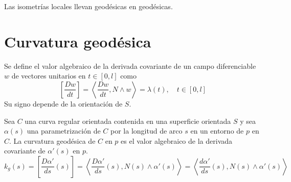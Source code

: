 \begin{corollary}
    Las isometrías locales llevan geodésicas en geodésicas.
\end{corollary}

\section{Curvatura geodésica}

\begin{definition}
    Se define el valor algebraico de la derivada covariante de un campo diferenciable $w$ de vectores unitarios en $t \in [0, l]$ como
    $$\left[ \frac{Dw}{dt} \right] = \left\langle \frac{Dw}{dt}, N \land w \right\rangle = \lambda(t), \quad t \in [0, l]$$
    Su signo depende de la orientación de $S$.
\end{definition}

\begin{definition}
    Sea $C$ una curva regular orientada contenida en una superficie orientada $S$ y sea $\alpha(s)$ una parametrización de $C$ por la longitud de arco $s$ en un entorno de $p$ en $C$.
    La curvatura geodésica de $C$ en $p$ es el valor algebraico de la derivada covariante de $\alpha'(s)$ en $p$.
    $$k_g(s) = \left[ \frac{D\alpha'}{ds}(s) \right] = \left\langle \frac{D\alpha'}{ds}(s), N(s) \land \alpha'(s) \right\rangle = \left\langle \frac{d\alpha'}{ds}(s), N(s) \land \alpha'(s) \right\rangle$$
\end{definition}

